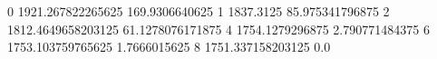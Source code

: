 0 1921.267822265625 169.9306640625
1 1837.3125 85.975341796875
2 1812.4649658203125 61.1278076171875
4 1754.1279296875 2.790771484375
6 1753.103759765625 1.7666015625
8 1751.337158203125 0.0

